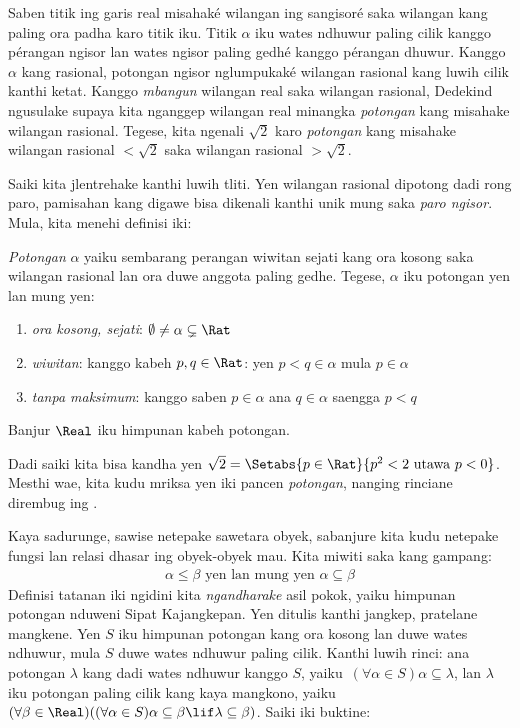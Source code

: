 \documentclass[../../../include/open-logic-section]{subfiles}
\begin{document}

Saben titik ing garis real misahaké wilangan ing sangisoré saka wilangan kang paling ora padha karo titik iku.
Titik $\alpha$ iku wates ndhuwur paling cilik kanggo pérangan ngisor
lan wates ngisor paling gedhé kanggo pérangan dhuwur. Kanggo $\alpha$
kang rasional, potongan ngisor nglumpukaké wilangan rasional kang
luwih cilik kanthi ketat. Kanggo \emph{mbangun}
wilangan real saka wilangan rasional, Dedekind ngusulake supaya kita
nganggep wilangan real minangka \emph{potongan} kang misahake wilangan
rasional. Tegese, kita ngenali $\sqrt{2}$ karo \emph{potongan} kang
misahake wilangan rasional $< \sqrt{2}$ saka wilangan rasional
$> \sqrt{2}$.

Saiki kita jlentrehake kanthi luwih tliti. Yen wilangan rasional dipotong
dadi rong paro, pamisahan kang digawe bisa dikenali kanthi unik mung saka
\emph{paro ngisor}. Mula, kita menehi definisi iki:

\begin{defn}[Potongan]
\emph{Potongan} $\alpha$ yaiku sembarang perangan wiwitan sejati kang ora
kosong saka wilangan rasional lan ora duwe anggota paling gedhe. Tegese,
$\alpha$ iku potongan yen lan mung yen:
\begin{enumerate}
	\item \emph{ora kosong, sejati}: $\emptyset \neq \alpha \subsetneq \Rat$
	\item \emph{wiwitan}: kanggo kabeh $p,q \in \Rat$: yen $p < q \in \alpha$ mula $p \in \alpha$
	\item \emph{tanpa maksimum}: kanggo saben $p \in \alpha$ ana $q \in \alpha$ saengga $p < q$
\end{enumerate}
Banjur $\Real$ iku himpunan kabeh potongan.
\end{defn}

Dadi saiki kita bisa kandha yen $\sqrt{2} = \Setabs{p \in \Rat}{p^2 < 2\text{
utawa }p < 0}$. Mesthi wae, kita kudu mriksa yen iki pancen
\emph{potongan}, nanging rinciane dirembug ing .

Kaya sadurunge, sawise netepake sawetara obyek, sabanjure kita kudu
netepake fungsi lan relasi dhasar ing obyek-obyek mau. Kita miwiti saka
kang gampang:
\begin{align*}
	\alpha \leq \beta \text{ yen lan mung yen }\alpha \subseteq \beta
\end{align*}
Definisi tatanan iki ngidini kita \emph{ngandharake} asil pokok,
yaiku himpunan potongan nduweni Sipat Kajangkepan. Yen ditulis kanthi
jangkep, pratelane mangkene. Yen $S$ iku himpunan potongan kang ora kosong
lan duwe wates ndhuwur, mula $S$ duwe wates ndhuwur paling cilik. Kanthi
luwih rinci: ana potongan $\lambda$ kang dadi wates ndhuwur kanggo $S$,
yaiku\ $(\forall \alpha \in S)\alpha \subseteq \lambda$, lan $\lambda$ iku
potongan paling cilik kang kaya mangkono, yaiku\ $(\forall \beta \in
\Real)((\forall \alpha \in S)\alpha \subseteq \beta \lif \lambda \subseteq
\beta)$. Saiki iki buktine:
\end{document}
